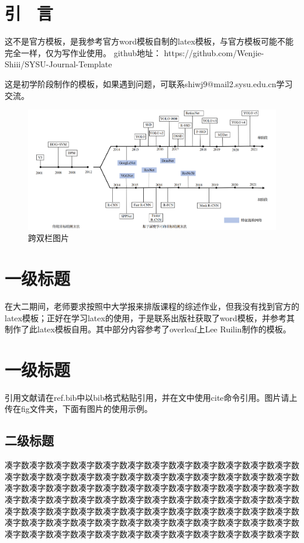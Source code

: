\documentclass{article}
\begin{document}
\begin{multicols}{2}

\section{ 引 \ 言}
\songti  %
这不是官方模板，是我参考官方word模板自制的latex模板，与官方模板可能不能完全一样，仅为写作业使用。 github地址： https://github.com/Wenjie-Shiii/SYSU-Journal-Template

这是初学阶段制作的模板，如果遇到问题，可联系shiwj9@mail2.sysu.edu.cn学习交流。

\begin{figure}[t]
    \centering
    \includegraphics[width=\textwidth]{fig/发展历程.png}
    \caption{跨双栏图片\cite{计算机工程与应用04_fig}}
    \label{fig:发展历程}
\end{figure}

\section{一级标题}
在大二期间，老师要求按照中大学报来排版课程的综述作业，但我没有找到官方的latex模板；正好在学习latex的使用，于是联系出版社获取了word模板，并参考其制作了此latex模板自用。其中部分内容参考了overleaf上Lee Ruilin制作的模板。

\section{一级标题}
引用文献请在ref.bib中以bib格式粘贴引用，并在文中使用cite命令引用。图片请上传在fig文件夹，下面有图片的使用示例。

\subsection{二级标题}
凑字数凑字数凑字数凑字数凑字数凑字数凑字数凑字数凑字数凑字数凑字数凑字数凑字数凑字数凑字数凑字数凑字数凑字数凑字数凑字数凑字数凑字数凑字数凑字数凑字数凑字数凑字数凑字数凑字数凑字数凑字数凑字数凑字数凑字数凑字数凑字数凑字数凑字数凑字数凑字数凑字数凑字数凑字数凑字数凑字数凑字数凑字数凑字数凑字数凑字数凑字数凑字数凑字数凑字数凑字数凑字数凑字数凑字数凑字数凑字数凑字数凑字数凑字数凑字数凑字数凑字数凑字数凑字数凑字数凑字数凑字数凑字数凑字数凑字数凑字数凑字数凑字数凑字数凑字数凑字数凑字数凑字数凑字数凑字数


\end{multicols}
\end{document}
